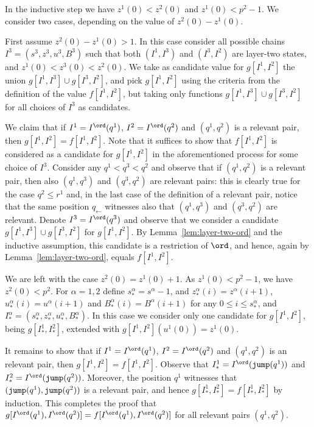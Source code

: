 In the inductive step we have $z^1(0) < z^2(0)$ and $z^1(0) < p^2-1$.
We consider two cases, depending on the value of $z^2(0) - z^1(0)$.

First assume $z^2(0) - z^1(0) > 1$.
In this case consider all possible chains $I^3 = (s^3,z^3,u^3,B^3)$ such that both $(I^1,I^3)$ and $(I^3,I^2)$ are layer-two states,
and $z^1(0) < z^3(0) < z^2(0)$.
We take as candidate value for $g[I^1,I^2]$ the union $g[I^1,I^3] \cup g[I^3,I^2]$, and pick $g[I^1,I^2]$ using the criteria
from the definition of the value $f[I^1,I^2]$, but taking only functions $g[I^1,I^3] \cup g[I^3,I^2]$ for all choices of $I^3$ as candidates.

We claim that if $I^1 = I^\ord(q^1)$, $I^2 = I^\ord(q^2)$ and $(q^1,q^2)$ is a relevant pair, then 
$g[I^1,I^2] = f[I^1,I^2]$. Note that it suffices to show that $f[I^1,I^2]$ is considered as a candidate for $g[I^1,I^2]$
in the aforementioned process for some choice of $I^3$.
Consider any $q^1 < q^3 < q^2$ and observe that if $(q^1,q^2)$ is a relevant pair,
then also $(q^1,q^3)$ and $(q^3,q^2)$ are relevant pairs: this is clearly true for
the case $q^2 \leq r^1$ and, in the last case of the definition of a relevant pair,
notice that the same position $q_\leftarrow$ witnesses also that $(q^1,q^3)$ and $(q^3,q^2)$ are relevant.
Denote $I^3 = I^\ord(q^3)$ and observe that we consider a candidate $g[I^1,I^3] \cup g[I^3,I^2]$ for $g[I^1,I^2]$.
By Lemma~\ref{lem:layer-two-ord} and the inductive assumption, this candidate is a restriction of $\ord$, and hence,
again by Lemma~\ref{lem:layer-two-ord}, equals $f[I^1,I^2]$.

We are left with the case $z^2(0) = z^1(0) + 1$. As $z^1(0) < p^2 - 1$, we have $z^2(0) < p^2$.
For $\alpha=1,2$ define $s^\alpha_\ast = s^\alpha-1$, and
$z^\alpha_\ast(i) = z^\alpha(i+1)$, $u^\alpha_\ast(i) = u^\alpha(i+1)$ and $B^\alpha_\ast(i) = B^\alpha(i+1)$
for any $0 \leq i \leq s^\alpha_\ast$, and $I^\alpha_\ast = (s^\alpha_\ast, z^\alpha_\ast, u^\alpha_\ast, B^\alpha_\ast)$.
In this case we consider only one candidate for $g[I^1,I^2]$, being $g[I^1_\ast,I^2_\ast]$, extended with 
$g[I^1,I^2](u^1(0)) = z^1(0)$.

It remains to show that if $I^1 = I^\ord(q^1)$, $I^2 = I^\ord(q^2)$ and $(q^1,q^2)$ is an relevant pair,
then $g[I^1,I^2] = f[I^1,I^2]$.
Observe that $I^1_\ast = I^\ord(\jump{q^1})$ and $I^2_\ast = I^\ord(\jump{q^2})$.
Moreover, the position $q^1$ witnesses that $(\mathtt{jump}(q^1),\mathtt{jump}(q^2))$ is a relevant pair, and hence
$g[I^1_\ast,I^2_\ast] = f[I^1_\ast,I^2_\ast]$ by induction.
This completes the proof that $g[I^\ord(q^1),I^\ord(q^2)] = f[I^\ord(q^1),I^\ord(q^2)]$ for all relevant pairs $(q^1,q^2)$.

